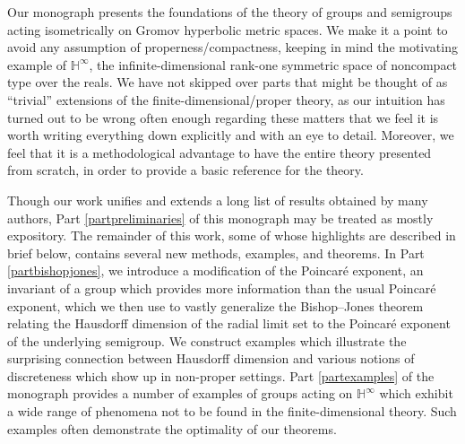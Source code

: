 \documentclass{surv-l}
\numberwithin{equation}{section}
\numberwithin{figure}{section}%
\theoremstyle{theorem}
\theoremstyle{definition}
\begin{document}
\begin{Abstract}
Our monograph presents the foundations of the theory of groups and semigroups acting isometrically on Gromov hyperbolic metric spaces. We make it a point to avoid any assumption of properness/compactness, keeping in mind the motivating example of $\mathbb H^\infty$, the infinite-dimensional rank-one symmetric space of noncompact type over the reals. We have not skipped over parts that might be thought of as ``trivial'' extensions of the finite-dimensional/proper theory, as our intuition has turned out to be wrong often enough regarding these matters that we feel it is worth writing everything down explicitly and with an eye to detail. Moreover, we feel that it is a methodological advantage to have the entire theory presented from scratch, in order to provide a basic reference for the theory.


Though our work unifies and extends a long list of results obtained by many authors, Part \ref{partpreliminaries} of this monograph may be treated as mostly expository. The remainder of this work, some of whose highlights are described in brief below, contains several new methods, examples, and theorems. In Part \ref{partbishopjones}, we introduce a modification of the Poincar\'e exponent, an invariant of a group which provides more information than the usual Poincar\'e exponent, which we then use to vastly generalize the Bishop--Jones theorem relating the Hausdorff dimension of the radial limit set to the Poincar\'e exponent of the underlying semigroup. We construct examples which illustrate the surprising connection between Hausdorff dimension and various notions of discreteness which show up in non-proper settings. Part \ref{partexamples} of the monograph provides a number of examples of groups acting on $\mathbb H^\infty$ which exhibit a wide range of phenomena not to be found in the finite-dimensional theory. Such examples often demonstrate the optimality of our theorems.


\end{Abstract}
\end{document}
